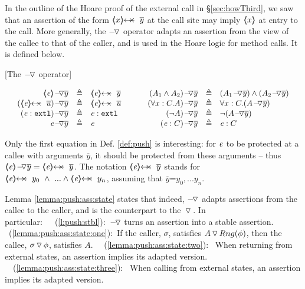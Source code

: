   \label{s:viewAndProtect}
 
In the outline of the Hoare proof of the external call in  \S  \ref{sec:howThird},  we saw that an assertion of the form $\protectedFrom x {\overline {y}}$ at the call site may imply $\inside{x}$ at entry to the call.
More generally,  the $\pushSymbolInText$ operator  adapts an assertion from the view of the callee to that of the caller,
 and is used in the Hoare logic for method calls. It is defined below. 
 
 
\begin{definition}
\label{def:push}
[The $\pushSymbolInText$  operator]  

$
\begin{array}{c}
\begin{array}{l}
\begin{array}{rclcrcl}
  \PushAS y {\inside \re} & \triangleq &  \protectedFrom \re {\overline {y} }
  & \ \ \  \ &
  \PushAS y   {(A_1  \wedge  A_2)} & \triangleq &  (\PushAS y  { A_1})  \wedge  ( \PushAS y  {A_2} )  
\\ 
 \PushAS y {(\protectedFrom \re {\overline {u}})} &  \triangleq& \protectedFrom \re {\overline {u}} 
  & &
 \PushAS y  {(\forall x:C.A)} & \triangleq & \forall x:C.({\PushAS y A} )  
  \\  
  \PushAS y  {(\external \re)} &  \triangleq & {\external \re}  %
  & & 
  \PushAS y  {(\neg A)} &  \triangleq & \neg( {\PushAS y A} )  
    \\
     \PushAS y  {\re} &  \triangleq&   \re %
    & &
    \PushAS y  {(\re:C)} &  \triangleq&   \re:C 
 \end{array}
\end{array}
\end{array}
$
\label{f:Push}
\end{definition}
 

Only the first equation in  Def.  \ref{def:push}  is interesting: for $\re$ to be {protected at  a} callee with arguments $\overline y$, it should be protected from   %
these arguments -- thus
  $\PushAS y {\inside \re} = \protectedFrom {\re} {\overline {y}}$. 
The notation $\protectedFrom {\re} {\overline {y}}$   stands for $\protectedFrom \re {y_0}\  \wedge\  ...  \wedge \protectedFrom \re {y_n}$, assuming that $\overline y$=${y_0, ... y_n}$.

Lemma \ref{lemma:push:ass:state}  states that   
indeed, $\pushSymbolInText$ adapts assertions from the callee to the caller, and is the counterpart to the  
$\pushSymbol$.
{In particular:\ \ 
 \ (\ref{l:push:stbl}):\    $\pushSymbolInText$ turns an assertion into a stable assertion.
\ (\ref{lemma:push:ass:state:one}):\ If the caller,   $\sigma$,  satisfies  $\PushSLong  {Rng(\phi)} {A}$, then  the callee,   $\PushSLong {\phi} {\sigma}$, satisfies $A$.
\ \ (\ref{lemma:push:ass:state:two}): \ When returning from external states,  an assertion implies its adapted version.
 \ \ (\ref{lemma:push:ass:state:three}): \ When calling from external states, an assertion implies its adapted version. %
}
  

